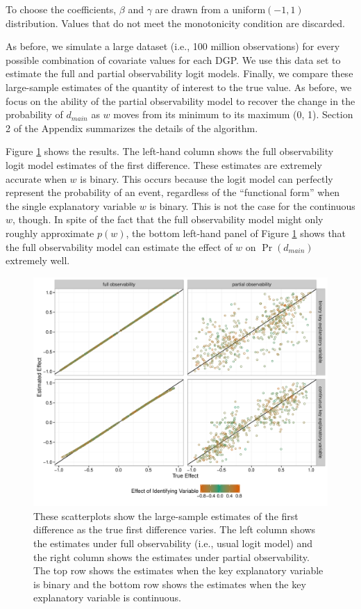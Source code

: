 \documentclass[10pt]{article}
\begin{document}
\noindent To choose the coefficients, $\beta$ and $\gamma$ are drawn from a uniform$(-1, 1)$ distribution. 
Values that do not meet the monotonicity condition are discarded.

As before, we simulate a large dataset (i.e., 100 million observations) for every possible combination of covariate values for each DGP. 
We use this data set to estimate the full and partial observability logit models.
Finally, we compare these large-sample estimates of the quantity of interest to the true value.
As before, we focus on the ability of the partial observability model to recover the change in the probability of $d_{main}$ as $w$ moves from its minimum to its maximum (0, 1). Section 2 of the Appendix summarizes the details of the algorithm.

Figure \ref{fig:mon-sims} shows the results. 
The left-hand column shows the full observability logit model estimates of the first difference. 
These estimates are extremely accurate when $w$ is binary. 
This occurs because the logit model can perfectly represent the probability of an event, regardless of the ``functional form'' when the single explanatory variable $w$ is binary. 
This is not the case for the continuous $w$, though. 
In spite of the fact that the full observability model might only roughly approximate $p(w)$, the bottom left-hand panel of Figure \ref{fig:mon-sims} shows that the full observability model can estimate the effect of $w$ on $\Pr(d_{main})$ extremely well.

\begin{figure}[H]
\begin{center}
\includegraphics[scale = 0.6]{figs/mon-sims-scatter.pdf}
\caption{These scatterplots show the large-sample estimates of the first difference as the true first difference varies. The left column shows the estimates under full observability (i.e., usual logit model) and the right column shows the estimates under partial observability. The top row shows the estimates when the key explanatory variable is binary and the bottom row shows the estimates when the key explanatory variable is continuous.}\label{fig:mon-sims}
\end{center}
\end{figure}
\end{document}
